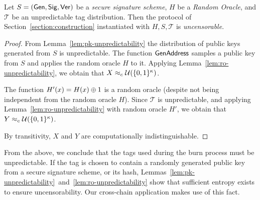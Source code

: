 \begin{theorem}[Uncensorability]
  Let $S = (\mathsf{Gen}, \mathsf{Sig}, \mathsf{Ver})$ be a \emph{secure signature scheme},
  $H$ be a \emph{Random Oracle},
  and $\mathcal{T}$ be an unpredictable tag distribution.
  Then the protocol of Section~\ref{section:construction} instantiated with
  $H, S, \mathcal{T}$ is \emph{uncensorable}.
\end{theorem}
\begin{proof}
  From Lemma~\ref{lem:pk-unpredictability} the distribution of
  public keys generated from $S$ is unpredictable. The
  function $\mathsf{GenAddress}$ samples a public key from $S$ and applies the
  random oracle $H$ to it. Applying
  Lemma~\ref{lem:ro-unpredictability}, we obtain that
  $X \approx_c \mathcal{U}(\{0, 1\}^\kappa)$.

  The function $H'(x) = H(x) \oplus 1$ is a random oracle (despite not
  being independent from the random oracle $H$).
  Since $\mathcal{T}$ is unpredictable, and
  applying Lemma~\ref{lem:ro-unpredictability} with random oracle $H'$, we
  obtain that $Y \approx_c \mathcal{U}(\{0, 1\}^\kappa)$.

  By transitivity, $X$ and $Y$ are computationally indistinguishable.
\end{proof}

From the above, we conclude that the tags used during the burn process must be
unpredictable. If the tag is chosen to contain a randomly generated public key
from a secure signature scheme, or its hash,
Lemmas~\ref{lem:pk-unpredictability}~and~\ref{lem:ro-unpredictability} show that
sufficient entropy exists to ensure uncensorability. Our cross-chain application
makes use of this fact.
